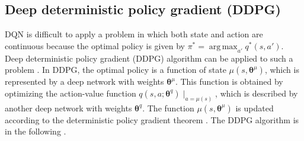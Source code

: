 \documentclass[11pt]{article}
\DeclareMathOperator*{\argmax}{arg\,max}
\begin{document}
\vspace{1zw}

\subsection{Deep deterministic policy gradient (DDPG)}

DQN is difficult to apply a problem in which both state and action are continuous because the optimal policy is given by $\pi^\ast = \argmax_{a'} q^\ast(s, a')$. Deep deterministic policy gradient (DDPG) algorithm can be applied to such a problem \citep{Silver:etal:2014, Lillicrap:etal:2015}. In DDPG, the optimal policy is a function of state $\mu(s, \bm{\theta}^\mu)$, which is represented by a deep network with weights $\bm{\theta}^\mu$. This function is obtained by optimizing the action-value function $q(s, a; \bm{\theta}^q)\mid_{a = \mu(s)}$, which is described by another deep network with weights $\bm{\theta}^q$. The function $\mu(s, \bm{\theta}^\mu)$ is updated according to the deterministic policy gradient theorem \citep{Silver:etal:2014}. The DDPG algorithm is in the following \citep{Lillicrap:etal:2015}.

\vspace{1zw}
\end{document}

